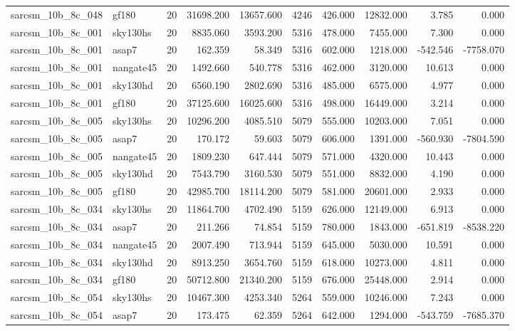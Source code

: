 \begin{tabular}{llrrrrrrrr}
sarcsm\_10b\_8c\_048 & gf180 & 20 & 31698.200 & 13657.600 & 4246 & 426.000 & 12832.000 & 3.785 & 0.000 \\
sarcsm\_10b\_8c\_001 & sky130hs & 20 & 8835.060 & 3593.200 & 5316 & 478.000 & 7455.000 & 7.300 & 0.000 \\
sarcsm\_10b\_8c\_001 & asap7 & 20 & 162.359 & 58.349 & 5316 & 602.000 & 1218.000 & -542.546 & -7758.070 \\
sarcsm\_10b\_8c\_001 & nangate45 & 20 & 1492.660 & 540.778 & 5316 & 462.000 & 3120.000 & 10.613 & 0.000 \\
sarcsm\_10b\_8c\_001 & sky130hd & 20 & 6560.190 & 2802.690 & 5316 & 485.000 & 6575.000 & 4.977 & 0.000 \\
sarcsm\_10b\_8c\_001 & gf180 & 20 & 37125.600 & 16025.600 & 5316 & 498.000 & 16449.000 & 3.214 & 0.000 \\
sarcsm\_10b\_8c\_005 & sky130hs & 20 & 10296.200 & 4085.510 & 5079 & 555.000 & 10203.000 & 7.051 & 0.000 \\
sarcsm\_10b\_8c\_005 & asap7 & 20 & 170.172 & 59.603 & 5079 & 606.000 & 1391.000 & -560.930 & -7804.590 \\
sarcsm\_10b\_8c\_005 & nangate45 & 20 & 1809.230 & 647.444 & 5079 & 571.000 & 4320.000 & 10.443 & 0.000 \\
sarcsm\_10b\_8c\_005 & sky130hd & 20 & 7543.790 & 3160.530 & 5079 & 551.000 & 8832.000 & 4.190 & 0.000 \\
sarcsm\_10b\_8c\_005 & gf180 & 20 & 42985.700 & 18114.200 & 5079 & 581.000 & 20601.000 & 2.933 & 0.000 \\
sarcsm\_10b\_8c\_034 & sky130hs & 20 & 11864.700 & 4702.490 & 5159 & 626.000 & 12149.000 & 6.913 & 0.000 \\
sarcsm\_10b\_8c\_034 & asap7 & 20 & 211.266 & 74.854 & 5159 & 780.000 & 1843.000 & -651.819 & -8538.220 \\
sarcsm\_10b\_8c\_034 & nangate45 & 20 & 2007.490 & 713.944 & 5159 & 645.000 & 5030.000 & 10.591 & 0.000 \\
sarcsm\_10b\_8c\_034 & sky130hd & 20 & 8913.250 & 3654.760 & 5159 & 618.000 & 10273.000 & 4.811 & 0.000 \\
sarcsm\_10b\_8c\_034 & gf180 & 20 & 50712.800 & 21340.200 & 5159 & 676.000 & 25448.000 & 2.914 & 0.000 \\
sarcsm\_10b\_8c\_054 & sky130hs & 20 & 10467.300 & 4253.340 & 5264 & 559.000 & 10246.000 & 7.243 & 0.000 \\
sarcsm\_10b\_8c\_054 & asap7 & 20 & 173.475 & 62.359 & 5264 & 642.000 & 1294.000 & -543.759 & -7685.370 \\

\end{tabular}
